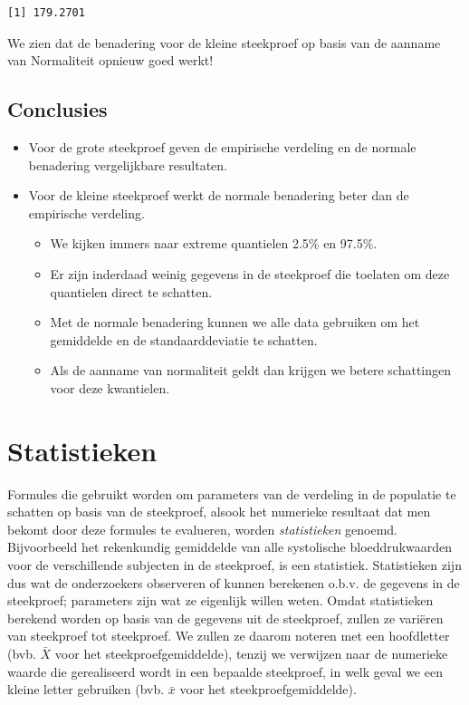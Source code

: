 \documentclass[
  dutch,
  letterpaper,
  12pt]{book}
\providecommand{\tightlist}{%
  \setlength{\itemsep}{0pt}\setlength{\parskip}{0pt}}
\theoremstyle{definition}
\theoremstyle{definition}
\theoremstyle{definition}
\theoremstyle{remark}
\begin{document}
\begin{verbatim}
[1] 179.2701
\end{verbatim}

We zien dat de benadering voor de kleine steekproef op basis van de
aanname van Normaliteit opnieuw goed werkt!

\subsection{Conclusies}\label{conclusies-1}

\begin{itemize}
\item
  Voor de grote steekproef geven de empirische verdeling en de normale
  benadering vergelijkbare resultaten.
\item
  Voor de kleine steekproef werkt de normale benadering beter dan de
  empirische verdeling.

  \begin{itemize}
  \tightlist
  \item
    We kijken immers naar extreme quantielen 2.5\% en 97.5\%.
  \item
    Er zijn inderdaad weinig gegevens in de steekproef die toelaten om
    deze quantielen direct te schatten.
  \item
    Met de normale benadering kunnen we alle data gebruiken om het
    gemiddelde en de standaarddeviatie te schatten.
  \item
    Als de aanname van normaliteit geldt dan krijgen we betere
    schattingen voor deze kwantielen.
  \end{itemize}
\end{itemize}

\section{Statistieken}\label{statistieken}

Formules die gebruikt worden om parameters van de verdeling in de
populatie te schatten op basis van de steekproef, alsook het numerieke
resultaat dat men bekomt door deze formules te evalueren, worden
\emph{statistieken} genoemd. Bijvoorbeeld het rekenkundig gemiddelde van
alle systolische bloeddrukwaarden voor de verschillende subjecten in de
steekproef, is een statistiek. Statistieken zijn dus wat de onderzoekers
observeren of kunnen berekenen o.b.v. de gegevens in de steekproef;
parameters zijn wat ze eigenlijk willen weten. Omdat statistieken
berekend worden op basis van de gegevens uit de steekproef, zullen ze
variëren van steekproef tot steekproef. We zullen ze daarom noteren met
een hoofdletter (bvb. \(\bar X\) voor het steekproefgemiddelde), tenzij
we verwijzen naar de numerieke waarde die gerealiseerd wordt in een
bepaalde steekproef, in welk geval we een kleine letter gebruiken (bvb.
\(\bar x\) voor het steekproefgemiddelde).
\end{document}

